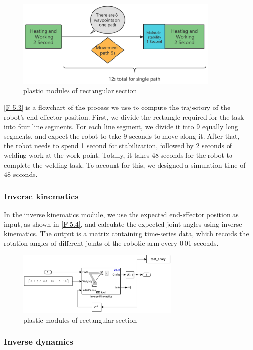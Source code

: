 \begin{figure}[htbp]
	\centering
	\includegraphics[width=10cm]{./fig/siwei.png}
	\caption{plastic modules of rectangular section  }
	\label{F 5.3}
\end{figure}

\autoref{F 5.3} is a flowchart of the process we use to compute the trajectory of the robot's end effector position. First, we divide the rectangle required for the task into four line segments. For each line segment, we divide it into 9 equally long segments, and expect the robot to take 9 seconds to move along it. After that, the robot needs to spend 1 second for stabilization, followed by 2 seconds of welding work at the work point. Totally, it takes 48 seconds for the robot to complete the welding task. To account for this, we designed a simulation time of 48 seconds. 

\subsubsection*{Inverse kinematics}

In the inverse kinematics module, we use the expected end-effector position as input, as shown in \autoref{F 5.4}, and calculate the expected joint angles using inverse kinematics. The output is a matrix containing time-series data, which records the rotation angles of different joints of the robotic arm every 0.01 seconds.
\begin{figure}[htbp]
	\centering
	\includegraphics[width=8cm]{./fig/IK.png}
	\caption{plastic modules of rectangular section  }
	\label{F 5.4}
\end{figure}

\subsubsection*{Inverse dynamics}

